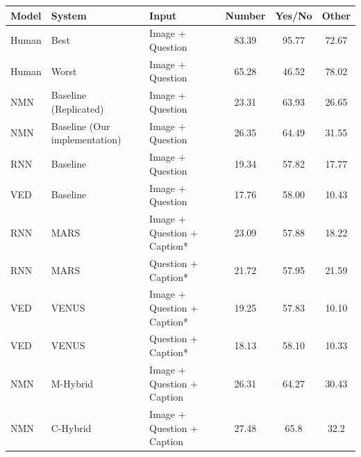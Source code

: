 \begin{table}[!h]
\centering
\small
\begin{tabular}{@{}lllccc@{}}
\toprule
                      
{ \textbf{Model}}  & {\textbf{{System}}} & {\textbf{{Input}}}    & \textbf{{Number}}             & \textbf{{Yes/No}}               & \textbf{{Other}}                \\ \midrule
Human & Best & Image + Question & 83.39   & 95.77      &   72.67    \\
Human & Worst & Image + Question  & 65.28          &    46.52   & 78.02      \\ \midrule
NMN  & Baseline (Replicated)                      & Image + Question           &            23.31	         &           63.93          &          	26.65              \\
NMN  & Baseline (Our implementation)                      & Image + Question           &            26.35	         &           64.49          &          	31.55              \\
RNN  & Baseline                    & Image + Question           &    19.34                 &    57.82                 &          17.77           \\
VED & Baseline                      & Image + Question             &     17.76                 &     58.00                &        10.43              \\ \midrule
RNN  &          MARS           & Image + Question + Caption* &                23.09      &       57.88               &     18.22                 \\



RNN   &          MARS          & Question + Caption*        &     21.72                 &             57.95         &      21.59                \\




VED   &        VENUS        & Image + Question + Caption* &   19.25                   &     57.83                 &      10.10                \\

VED   &        VENUS          & Question + Caption*        &            18.13          &        58.10              &        10.33 \\ 
\midrule
NMN  & M-Hybrid            & Image + Question + Caption &     26.31                 &       	64.27	            &      30.43                  \\
NMN  & C-Hybrid           & Image + Question + Caption & 27.48 & 65.8& 	32.2\\ 	


\end{tabular}
\end{table}
